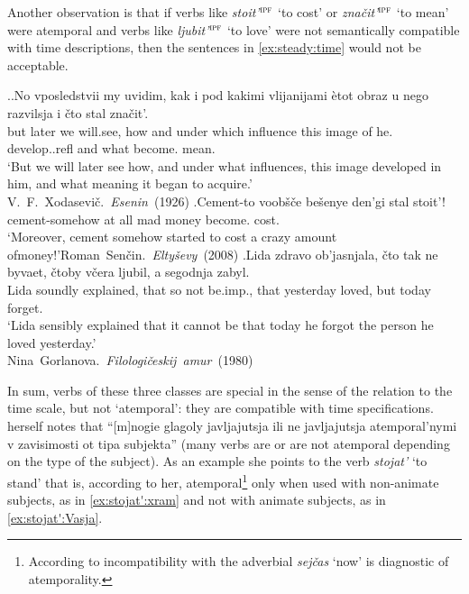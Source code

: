 Another observation is that if verbs like \textit{stoit'}$^{\textsc{ipf}}$ `to cost' or \textit{zna\v{c}it'}$^{\textsc{ipf}}$ `to mean' were atemporal and verbs like \textit{ljubit'$^{\textsc{ipf}}$} `to love' were not semantically compatible with time descriptions, then the sentences in \ref{ex:steady:time} would not be acceptable.

\ex.\label{ex:steady:time}\ag.No vposledstvii my uvidim, kak i pod kakimi vlijanijami \`{e}tot obraz u nego razvilsja i \v{c}to stal zna\v{c}it'.\\
but later we will.see, how and under which influence this image of he. develop..refl and what become. mean.\\
\trans `But we will later see how, and under what influences, this image developed in him, and what meaning it began to acquire.'\\\hbox{}\hfill\hbox{V. F. Xodasevi\v{c}. \textit{Esenin} (1926)}
\bg.Cement-to voob\v{s}\v{c}e be\v{s}enye den'gi stal stoit'!\\
cement-somehow {at all} mad money become. cost.\\
\trans `Moreover, cement somehow started to cost a crazy amount of\linebreak money!'\hbox{}\hfill\hbox{Roman Sen\v{c}in. \textit{Elty\v{s}evy} (2008)}
\bg.Lida zdravo ob'jasnjala, \v{c}to tak ne byvaet, \v{c}toby v\v{c}era ljubil, a segodnja zabyl.\\
Lida soundly explained, that so not be.imp., that yesterday loved, but today forget.\\
\trans `Lida sensibly explained that it cannot be that today he forgot the person he loved yesterday.'\\\hbox{}\hfill\hbox{Nina Gorlanova. \textit{Filologi\v{c}eskij amur} (1980)}

In sum, verbs of these three classes are special in the sense of the relation to the time scale, but not `atemporal': they are compatible with time specifications. \citet[132]{Paducheva:96} herself notes that ``[m]nogie glagoly javljajutsja ili ne javljajutsja atemporal'nymi v zavisimosti ot tipa subjekta'' (many verbs are or are not atemporal depending on the type of the subject). As an example she points to the verb \textit{stojat'} `to stand' that is, according to her, atemporal\footnote{According to \citet{Paducheva:96} incompatibility with the adverbial \textit{sej\v{c}as} `now' is diagnostic of atemporality.} only when used with non-animate subjects, as in \ref{ex:stojat':xram} and not with animate subjects, as in \ref{ex:stojat':Vasja}.

